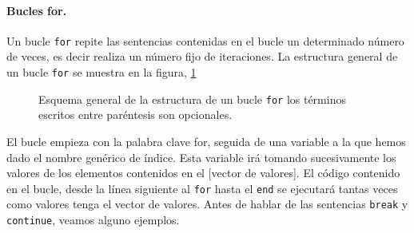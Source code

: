 \paragraph{Bucles for.} Un bucle \texttt{for} repite las sentencias contenidas en el bucle un determinado número de veces, es decir realiza un número fijo de iteraciones. La estructura general de un bucle \texttt{for} se muestra en la figura, \ref{fig:for}

\begin{figure}[h]
\centering
{}
\caption{Esquema general de la estructura de un bucle \texttt{for} los términos escritos entre paréntesis son opcionales.}
\label{fig:for}
\end{figure} 
 
El bucle empieza con la palabra clave for, seguida de una variable a la que hemos dado el nombre genérico de índice. Esta variable irá tomando sucesivamente los valores de los elementos contenidos en el [vector de valores]. El código contenido en el bucle, desde la línea siguiente al \texttt{for} hasta el \texttt{end} se ejecutará tantas veces como valores tenga el vector de valores. Antes de hablar de las sentencias \texttt{break} y \texttt{continue}, veamos alguno ejemplos.



